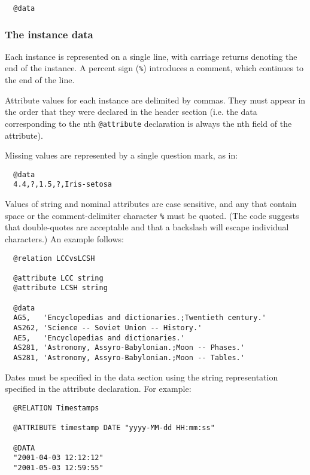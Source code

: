 \begin{verbatim}
  @data
\end{verbatim}


\subsubsection*{The instance data}
Each instance is represented on a single line, with carriage returns denoting the end of the instance. A percent sign (\texttt{\%}) introduces a comment, which continues to the end of the line.

Attribute values for each instance are delimited by commas. They must appear in the order that they were declared in the header section (i.e. the data corresponding to the nth \texttt{@attribute} declaration is always the nth field of the attribute).

Missing values are represented by a single question mark, as in:

\begin{verbatim}
  @data
  4.4,?,1.5,?,Iris-setosa
\end{verbatim}

\noindent Values of string and nominal attributes are case sensitive, and any that contain space or the comment-delimiter character \texttt{\%} must be quoted. (The code suggests that double-quotes are acceptable and that a backslash will escape individual characters.) An example follows:

\begin{verbatim}
  @relation LCCvsLCSH

  @attribute LCC string
  @attribute LCSH string

  @data
  AG5,   'Encyclopedias and dictionaries.;Twentieth century.'
  AS262, 'Science -- Soviet Union -- History.'
  AE5,   'Encyclopedias and dictionaries.'
  AS281, 'Astronomy, Assyro-Babylonian.;Moon -- Phases.'
  AS281, 'Astronomy, Assyro-Babylonian.;Moon -- Tables.'
\end{verbatim}

\noindent Dates must be specified in the data section using the string representation specified in the attribute declaration. For example:

\begin{verbatim}
  @RELATION Timestamps

  @ATTRIBUTE timestamp DATE "yyyy-MM-dd HH:mm:ss"

  @DATA
  "2001-04-03 12:12:12"
  "2001-05-03 12:59:55"
\end{verbatim}

